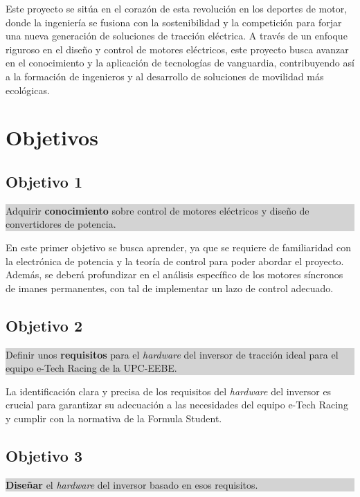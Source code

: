 Este proyecto se sitúa en el corazón de esta revolución en los deportes de motor, donde la ingeniería se fusiona con la sostenibilidad y la competición para forjar una nueva generación de soluciones de tracción eléctrica. A través de un enfoque riguroso en el diseño y control de motores eléctricos, este proyecto busca avanzar en el conocimiento y la aplicación de tecnologías de vanguardia, contribuyendo así a la formación de ingenieros y al desarrollo de soluciones de movilidad más ecológicas.

\section{Objetivos}

\subsection*{Objetivo 1}
\setlength{\fboxsep}{10pt}
\setlength{\fboxrule}{1pt}
\setlength{\parindent}{0pt}
\setlength{\parskip}{10pt}
\setlength{\leftskip}{\dimexpr\fboxsep+\fboxrule}
\setlength{\rightskip}{\dimexpr\fboxsep+\fboxrule}
\colorbox{lightgray}{%
	\parbox{\dimexpr\linewidth-2\fboxsep-2\fboxrule}{%
		Adquirir \textbf{conocimiento} sobre control de motores eléctricos y diseño de convertidores de potencia.%
	}%
}

En este primer objetivo se busca aprender, ya que se requiere de familiaridad con la electrónica de potencia y la teoría de control para poder abordar el proyecto. Además, se deberá profundizar en el análisis específico de los motores síncronos de imanes permanentes, con tal de implementar un lazo de control adecuado.


\subsection*{Objetivo 2}
\colorbox{lightgray}{%
	\parbox{\dimexpr\linewidth-2\fboxsep-2\fboxrule}{%
		Definir unos \textbf{requisitos} para el \textit{hardware} del inversor de tracción ideal para el equipo e-Tech Racing de la UPC-EEBE.%
	}%
}

La identificación clara y precisa de los requisitos del \textit{hardware} del inversor es crucial para garantizar su adecuación a las necesidades del equipo e-Tech Racing y cumplir con la normativa de la Formula Student.

\subsection*{Objetivo 3}
\colorbox{lightgray}{%
	\parbox{\dimexpr\linewidth-2\fboxsep-2\fboxrule}{%
		\textbf{Diseñar} el \textit{hardware} del inversor basado en esos requisitos.%
	}%
}

